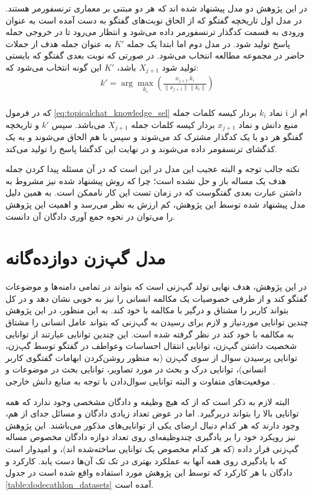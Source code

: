 در این پژوهش دو مدل پیشنهاد شده اند که هر دو مبتنی بر معماری ترنسفورمر هستند. در مدل اول تاریخچه گفتگو که از الحاق نوبت‌های گفتگو به دست آمده است به عنوان ورودی به قسمت کدگذار ترنسفورمر داده می‌شود و انتظار می‌رود تا در خروجی جمله پاسخ تولید شود.
در مدل دوم اما ابتدا یک جمله 
$K'$ 
به عنوان جمله هدف از جملات حاضر در مجموعه مطالعه انتخاب می‌شود. در صورتی که نوبت‌ بعدی گفتگو که بایستی تولید شود 
$X_{j+1}$
باشد، 
$K'$
این گونه انتخاب می‌شود که:
\\
\begin{gather} \label{eq:topicalchat_knowledge_sel}
k' = \arg\max_{k_i}{
(\frac{x_{j+1}.k_i}{\lVert  x_{j+1}  \rVert 
	\lVert  k_i  \rVert})
}
\end{gather}
\\
که در فرمول 
\ref{eq:topicalchat_knowledge_sel}
نماد‌
$k_i$
بردار کیسه کلمات جمله i ام از منبع دانش و نماد
$x_{j+1}$
بردار کیسه کلمات جمله 
$X_{j+1}$
می‌باشد.
سپس 
$k'$
و تاریخچه گفتگو هر دو با یک کدگذار مشترک کد می‌شوند و سپس با هم الحاق می‌شوند و به یک کد‌گشای ترنسفومر داده می‌شوند و در نهایت این کدگشا پاسخ را تولید می‌کند. 

نکته جالب توجه و البته عجیب این مدل در این است که در آن مسئله پیدا کردن جمله هدف یک مساله باز و حل نشده است؛ چرا که روش پیشنهاد شده نیز مشروط به داشتن عبارت بعدی گفتگوست که در زمان تست این کار ناممکن است. به همین دلیل مدل پیشنهاد شده توسط این پژوهش، کم ارزش به نظر می‌رسد و اهمیت این پژوهش را می‌توان در نحوه جمع آوری دادگان آن دانست.


\section{مدل گپ‌زن دوازده‌گانه}
در این پژوهش، هدف نهایی تولد گپ‌زنی است که بتواند در تمامی دامنه‌ها و موضوعات گفتگو کند و از طرفی خصوصیات یک مکالمه انسانی را نیز به خوبی نشان دهد و در کل بتواند کاربر را مشتاق و درگیر با مکالمه با خود کند. به این منظور، ‌در این پژوهش چندین توانایی موردنیاز و لازم برای رسیدن به گپ‌زنی که بتواند عامل انسانی را مشتاق به مکالمه با خود کند در نظر گرفته شده است. این چندین توانایی عبارتند از توانایی شخصیت داشتن گپ‌زن، توانایی انتقال احساسات وعواطف  در گفتگو توسط گپ‌زن، توانایی پرسیدن سوال از سوی گپ‌زن (به منظور روشن‌کردن ابهامات گفتگوی کاربر انسانی)، توانایی درک و بحث در مورد تصاویر، توانایی بحث در موضوعات و موقعیت‌های متفاوت و البته توانایی سوال‌دادن با توجه به منابع دانش خارجی
\cite{dodecathlon_paper}.

البته لازم به ذکر است که از که هیچ وظیفه و دادگان مشخصی وجود ندارد که همه توانایی بالا را بتواند دربرگیرد. اما در عوض تعداد زیادی دادگان و مسائل جدای از هم، ‌وجود دارند که هر کدام دنبال ارضای یکی از توانایی‌های مذکور می‌باشند. این پژوهش نیز رویکرد خود را بر یادگیری چندوظیفه‌ای روی تعداد دوازه دادگان مخصوص مساله گپ‌زنی‌ قرار داده (که هر کدام مخصوص یک توانایی ساخته‌شده اند)، و امیدوار است که با یادگیری روی همه آنها به عملکرد بهتری در تک تک آن‌ها دست یابد. کارکرد و دادگان با هر کارکرد که توسط این پژوهش مورد استفاده واقع شده است در جدول 
\ref{table:dodecathlon_datasets}
آمده است.

